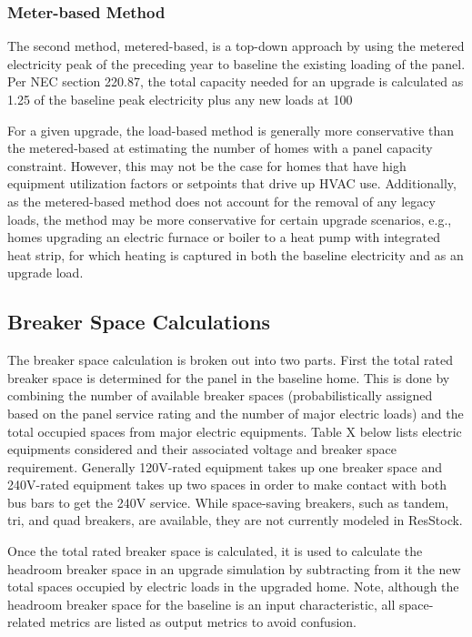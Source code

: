 \subsubsection{Meter-based Method}
The second method, metered-based, is a top-down approach by using the metered electricity peak of the preceding year to baseline the existing loading of the panel. Per NEC section 220.87, the total capacity needed for an upgrade is calculated as 1.25 of the baseline peak electricity plus any new loads at 100%

For a given upgrade, the load-based method is generally more conservative than the metered-based at estimating the number of homes with a panel capacity constraint. However, this may not be the case for homes that have high equipment utilization factors or setpoints that drive up HVAC use. Additionally, as the metered-based method does not account for the removal of any legacy loads, the method may be more conservative for certain upgrade scenarios, e.g., homes upgrading an electric furnace or boiler to a heat pump with integrated heat strip, for which heating is captured in both the baseline electricity and as an upgrade load.

\subsection{Breaker Space Calculations}
The breaker space calculation is broken out into two parts. First the total rated breaker space is determined for the panel in the baseline home. This is done by combining the number of available breaker spaces (probabilistically assigned based on the panel service rating and the number of major electric loads) and the total occupied spaces from major electric equipments. Table X below lists electric equipments considered and their associated voltage and breaker space requirement. Generally 120V-rated equipment takes up one breaker space and 240V-rated equipment takes up two spaces in order to make contact with both bus bars to get the 240V service. While space-saving breakers, such as tandem, tri, and quad breakers, are available, they are not currently modeled in ResStock.


Once the total rated breaker space is calculated, it is used to calculate the headroom breaker space in an upgrade simulation by subtracting from it the new total spaces occupied by electric loads in the upgraded home. Note, although the headroom breaker space for the baseline is an input characteristic, all space-related metrics are listed as output metrics to avoid confusion.

